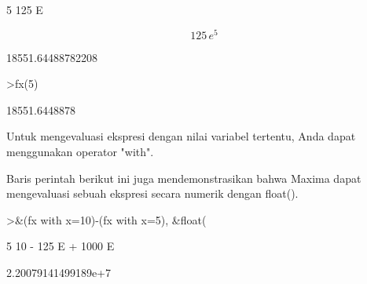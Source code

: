 \documentclass[a4paper,10pt]{article}
\begin{document}
\begin{eulernotebook}
\begin{eulercomment}
\begin{eulercomment}
\begin{euleroutput}
                                       5
                                  125 E
  
\end{euleroutput}
\begin{eulerformula}
\[
125\,e^5
\]
\end{eulerformula}
\begin{euleroutput}
  
                            18551.64488782208
  
\end{euleroutput}
\begin{eulerprompt}
>fx(5)
\end{eulerprompt}
\begin{euleroutput}
  18551.6448878
\end{euleroutput}
\begin{eulercomment}
Untuk mengevaluasi ekspresi dengan nilai variabel tertentu, Anda dapat
menggunakan operator "with".

Baris perintah berikut ini juga mendemonstrasikan bahwa Maxima dapat
mengevaluasi sebuah ekspresi secara numerik dengan float().
\end{eulercomment}
\begin{eulerprompt}
>&(fx with x=10)-(fx with x=5), &float(%
\end{eulerprompt}
\begin{euleroutput}
  
                                  5         10
                           - 125 E  + 1000 E
  
  
                           2.20079141499189e+7
  

\end{euleroutput}
\end{eulercomment}
\end{eulercomment}
\end{eulernotebook}
\end{document}
